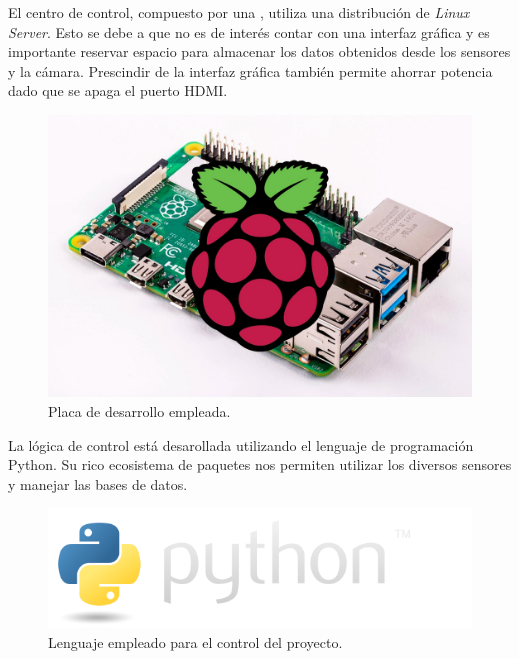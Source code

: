 El centro de control, compuesto por una \rspi, utiliza una distribución de \textit{Linux Server}. Esto se debe a que no es de interés contar con una interfaz gráfica y es importante reservar espacio para almacenar los datos obtenidos desde los sensores y la cámara. 
Prescindir de la interfaz gráfica también permite ahorrar potencia dado que se apaga el puerto HDMI.

\begin{figure}[H]
	\centering
	\includegraphics[width=0.7\linewidth]{"../Ingenieria de Detalle/ImagenesIngenieria de Detalle/rpi_with_board"}
	\caption{Placa de desarrollo empleada.}
\end{figure}



La lógica de control está desarollada utilizando el lenguaje de programación Python. Su rico ecosistema de paquetes nos permiten utilizar los diversos sensores y manejar las bases de datos.

\begin{figure}[H]
	\centering
	\includegraphics[width=0.7\linewidth]{"../Ingenieria de Detalle/ImagenesIngenieria de Detalle/python-logo@2x"}
	\caption{Lenguaje empleado para el control del proyecto.}
\end{figure}










